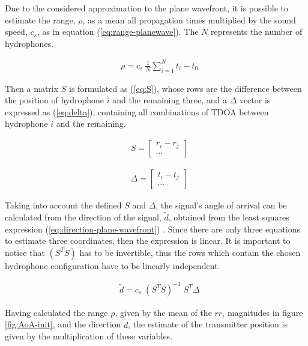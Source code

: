 Due to the considered approximation to the plane wavefront, it is possible to estimate the range, $\rho$, as a mean all propagation times multiplied by the sound speed, $c_s$, as in equation (\ref{eq:range-planewave}). The $N$ represents the number of hydrophones.

\begin{eqnarray}
& \rho = c_s\ \frac{1}{N} \displaystyle\sum_{i=1}^{N} t_{i} - t_0
\label{eq:range-planewave}
\end{eqnarray}

Then a matrix $S$ is formulated as (\ref{eq:S}), whose rows are the difference between the position of hydrophone $i$ and the remaining three, and a $\Delta$ vector is expressed as (\ref{eq:delta}), containing all combinations of TDOA between hydrophone $i$ and the remaining.

\begin{eqnarray}
	& S = 
	\begin{bmatrix}
		r_i - r_j \\
		\cdots 
	\end{bmatrix}
	\label{eq:S}
\end{eqnarray}

\begin{eqnarray}
	& \Delta = 
	\begin{bmatrix}
		t_i - t_j \\
		\cdots 
	\end{bmatrix}
	\label{eq:delta}
\end{eqnarray}

Taking into account the defined $S$ and $\Delta$, the signal's angle of arrival can be calculated from the direction of the signal, $\tilde{d}$, obtained from the least squares expression (\ref{eq:direction-plane-wavefront}) \cite{estim-plane-wavefront}. Since there are only three equations to estimate three coordinates, then the expression is linear. It is important to notice that $(S^TS)$ has to be invertible, thus the rows which contain the chosen hydrophone configuration have to be linearly independent.

\begin{eqnarray}
& \tilde{d} = c_s \; (S^{T}S)^{-1} \; S^{T} \Delta
\label{eq:direction-plane-wavefront}
\end{eqnarray}

Having calculated the range $\rho$, given by the mean of the $rr_i$ magnitudes in figure \ref{fig:AoA-init}, and the direction $\tilde{d}$, the estimate of the transmitter position is given by the multiplication of these variables.

